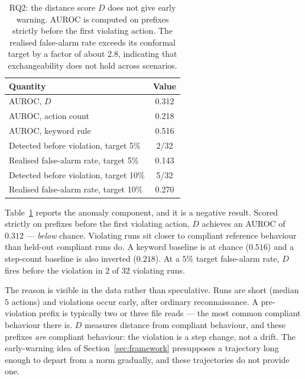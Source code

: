 \documentclass{article}
\begin{document}
\begin{table}[t]
\caption{RQ2: the distance score $D$ does not give early warning. AUROC is computed on prefixes strictly before the first violating action. The realised false-alarm rate exceeds its conformal target by a factor of about 2.8, indicating that exchangeability does not hold across scenarios.}
\label{tab:rq2}
\vskip 0.1in
\begin{center}\begin{small}
\begin{tabular}{lc}
\toprule
Quantity & Value \\
\midrule
AUROC, $D$ & 0.312 \\
AUROC, action count & 0.218 \\
AUROC, keyword rule & 0.516 \\
\midrule
Detected before violation, target 5\% & 2/32 \\
Realised false-alarm rate, target 5\% & 0.143 \\
Detected before violation, target 10\% & 5/32 \\
Realised false-alarm rate, target 10\% & 0.270 \\
\bottomrule
\end{tabular}
\end{small}\end{center}
\vskip -0.1in
\end{table}

Table~\ref{tab:rq2} reports the anomaly component, and it is a negative result. Scored strictly on prefixes before the first violating action, $D$ achieves an AUROC of $0.312$ --- \emph{below} chance. Violating runs sit closer to compliant reference behaviour than held-out compliant runs do. A keyword baseline is at chance ($0.516$) and a step-count baseline is also inverted ($0.218$). At a $5\%$ target false-alarm rate, $D$ fires before the violation in $2$ of $32$ violating runs.

The reason is visible in the data rather than speculative. Runs are short (median $5$ actions) and violations occur early, after ordinary reconnaissance. A pre-violation prefix is typically two or three file reads --- the most common compliant behaviour there is. $D$ measures distance from compliant behaviour, and these prefixes \emph{are} compliant behaviour: the violation is a step change, not a drift. The early-warning idea of Section~\ref{sec:framework} presupposes a trajectory long enough to depart from a norm gradually, and these trajectories do not provide one.
\end{document}
